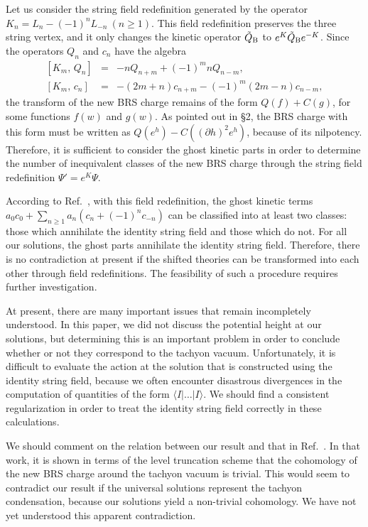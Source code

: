 \documentclass[a4paper,seceq,preprint]{ptptex}
\begin{document}
Let us consider the string field redefinition generated by the operator
$K_n=L_n-(-1)^n L_{-n}\ (n\geq 1)$. This field redefinition preserves the
three string vertex, and it only changes the kinetic operator
$\tilde{Q}_{\rm B}$ to $e^K \tilde{Q}_{\rm B} e^{-K}$.\cite{rf:SCSFT,rf:RSZ}
Since the operators $Q_n$ and $c_n$ have the algebra
\begin{eqnarray}
\left[K_m, \, Q_n \right]
&=& -n Q_{n+m}+ (-1)^m n Q_{n-m}, \\
\left[
K_m,\, c_n \right]
 &=& -(2m+n) c_{n+m} -(-1)^m (2m-n) c_{n-m},
\end{eqnarray}
the transform of the new BRS charge
remains of the form $Q(f)+C(g)$, for some functions $f(w)$ and $g(w)$.
As pointed out in \S 2, the BRS charge with this form must be
written as $Q(e^h)-C((\partial h)^2 e^h)$, because of its nilpotency.
Therefore, it is sufficient to consider the ghost kinetic parts in order
to determine the number of inequivalent classes of the new BRS charge through
the string field redefinition $\Psi'=e^K \Psi$.

According to Ref.~, with this field redefinition, the ghost
kinetic terms $a_0c_0+\sum_{n\geq 1} 
a_n (c_n+(-1)^n c_{-n})$ can be classified into at least two classes: those
which annihilate the identity string field and those which do not. For
all our solutions, the ghost parts annihilate the
identity string field.\cite{rf:TT,rf:Schnabl2}
Therefore, there is no contradiction at present if the shifted theories
can be transformed into each other through field redefinitions.
The feasibility of such a procedure requires further investigation.

At present, there are many important issues that remain incompletely
understood.
In this paper, we did not discuss the potential height at our solutions, but
determining this is an important problem in order to conclude whether or
not they correspond to the tachyon vacuum. 
Unfortunately, it is difficult to evaluate the action at the solution
that is constructed using the identity string field, because we often encounter
disastrous divergences in the computation of quantities of 
the form $\langle I |\dots |
I\rangle$.  We should find a consistent regularization in order to treat
the identity string field correctly in these calculations.  

We should comment on the relation between our result and that in
Ref.~. In that work, it is shown
in terms of the level truncation scheme
that the cohomology of the new BRS
charge around the tachyon vacuum is trivial.
This would seem to contradict our result if the universal
solutions represent the tachyon condensation, because our solutions
yield a non-trivial cohomology.
We have not yet understood this apparent contradiction.
\end{document}
